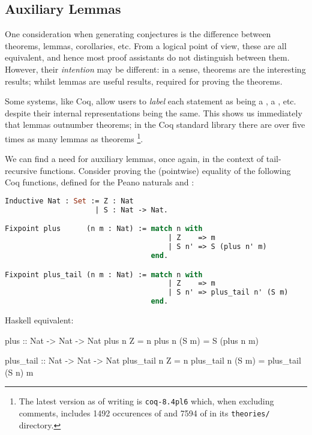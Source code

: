\subsection{Auxiliary Lemmas} \label{sec:auxiliarylemmas}

One consideration when generating conjectures is the difference between
theorems, lemmas, corollaries, etc. From a logical point of view, these are all
equivalent, and hence most proof assistants do not distinguish between
them. However, their \emph{intention} may be different: in a sense, theorems are
the interesting results; whilst lemmas are useful results, required for proving
the theorems.

Some systems, like Coq, allow users to \emph{label} each statement as being a
, a , etc. despite their internal representations being
the same. This shows us immediately that lemmas outnumber theorems; in the Coq
standard library there are over five times as many lemmas as theorems
\footnote{The latest version as of writing is \texttt{coq-8.4pl6} which, when
  excluding comments, includes 1492 occurences of  and 7594 of
   in its \texttt{theories/} directory.}.



We can find a need for auxiliary lemmas, once again, in the context of
tail-recursive functions. Consider proving the (pointwise) equality of the
following Coq functions, defined for the Peano naturals  and :

\begin{lstlisting}[language=ML, xleftmargin=.2\textwidth, xrightmargin=.2\textwidth]
Inductive Nat : Set := Z : Nat
                     | S : Nat -> Nat.

Fixpoint plus      (n m : Nat) := match n with
                                      | Z    => m
                                      | S n' => S (plus n' m)
                                  end.

Fixpoint plus_tail (n m : Nat) := match n with
                                      | Z    => m
                                      | S n' => plus_tail n' (S m)
                                  end.
\end{lstlisting}

\begin{haskell}
Haskell equivalent:

plus :: Nat -> Nat -> Nat
plus      n  Z    = n
plus      n (S m) = S (plus n m)

plus_tail :: Nat -> Nat -> Nat
plus_tail n  Z    = n
plus_tail n (S m) = plus_tail (S n) m
\end{haskell}


